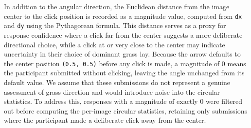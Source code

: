 \documentclass[
]{article}
\newenvironment{Shaded}{\begin{snugshade}}{\end{snugshade}}
\newcommand{\AttributeTok}[1]{\textcolor[rgb]{0.40,0.45,0.13}{#1}}
\newcommand{\CommentTok}[1]{\textcolor[rgb]{0.37,0.37,0.37}{#1}}
\newcommand{\ConstantTok}[1]{\textcolor[rgb]{0.56,0.35,0.01}{#1}}
\newcommand{\DecValTok}[1]{\textcolor[rgb]{0.68,0.00,0.00}{#1}}
\newcommand{\ErrorTok}[1]{\textcolor[rgb]{0.68,0.00,0.00}{#1}}
\newcommand{\FloatTok}[1]{\textcolor[rgb]{0.68,0.00,0.00}{#1}}
\newcommand{\FunctionTok}[1]{\textcolor[rgb]{0.28,0.35,0.67}{#1}}
\newcommand{\NormalTok}[1]{\textcolor[rgb]{0.00,0.23,0.31}{#1}}
\newcommand{\SpecialCharTok}[1]{\textcolor[rgb]{0.37,0.37,0.37}{#1}}
\newcommand{\StringTok}[1]{\textcolor[rgb]{0.13,0.47,0.30}{#1}}
\begin{document}
\begin{Shaded}
\end{Shaded}

In addition to the angular direction, the Euclidean distance from the
image center to the click position is recorded as a magnitude value,
computed from \texttt{dx} and \texttt{dy} using the Pythagorean formula.
This distance serves as a proxy for response confidence where a click
far from the center suggests a more deliberate directional choice, while
a click at or very close to the center may indicate uncertainty in their
choice of dominant grass lay. Because the arrow defaults to the center
position \texttt{(0.5,\ 0.5)} before any click is made, a magnitude of 0
means the participant submitted without clicking, leaving the angle
unchanged from its default value. We assume that these submissions do
not represent a genuine assessment of grass direction and would
introduce noise into the circular statistics. To address this, responses
with a magnitude of exactly 0 were filtered out before computing the
per-image circular statistics, retaining only submissions where the
participant made a deliberate click away from the center.
\end{document}
